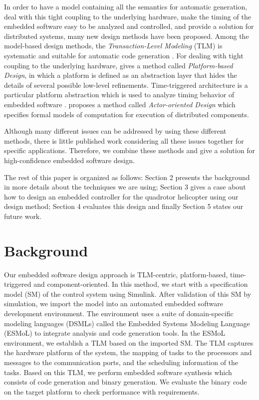\documentclass[10pt, conference, compsocconf]{IEEEtran}
\begin{document}
In order to have a model containing all the semantics for automatic generation, deal with this tight coupling to the underlying hardware, make the timing of the embedded software easy to be analyzed and controlled, and provide a solution for distributed systems, many new design methods have been proposed. Among the model-based design methods, the \emph{Transaction-Level Modeling} (TLM) is systematic and suitable for automatic code generation \cite{modeling:embedded}\cite{modeling:tlm}. For dealing with tight coupling to the underlying hardware, \cite{modeling:platform} gives a method called \emph{Platform-based Design}, in which a platform is defined as an abstraction layer that hides the details of several possible low-level refinements. Time-triggered architecture is a particular platform abstraction which is used to analyze timing behavior of embedded software \cite{modeling:giotto3}. \cite{embedded:software} proposes a method called \emph{Actor-oriented Design} which specifies formal models of computation for execution of distributed components.

Although many different issues can be addressed by using these different methods, there is little published work considering all these issues together for specific applications. Therefore, we combine these methods and give a solution for high-confidence embedded software design.

The rest of this paper is organized as follows: Section 2 presents the background in more details about the techniques we are using; Section 3 gives a case about how to design an embedded controller for the quadrotor helicopter using our design method; Section 4 evaluates this design and finally Section 5 states our future work.


\section{Background}

Our embedded software design approach is TLM-centric, platform-based, time-triggered and component-oriented. In this method, we start with a specification model (SM) of the control system using Simulink. After validation of this SM by simulation, we import the model into an automated embedded software development environment. The environment uses a suite of domain-specific modeling languages (DSMLs) called the Embedded Systems Modeling Language (ESMoL) to integrate analysis and code generation tools. In the ESMoL environment, we establish a TLM based on the imported SM. The TLM captures the hardware platform of the system, the mapping of tasks to the processors and messages to the communication ports, and the scheduling information of the tasks. Based on this TLM, we perform embedded software synthesis which consists of code generation and binary generation. We evaluate the binary code on the target platform to check performance with requirements.
\end{document}
